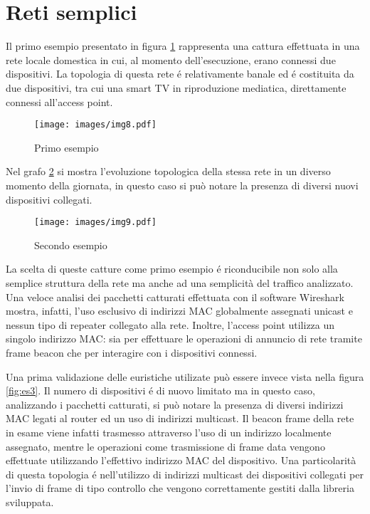 \section{Reti semplici}

Il primo esempio presentato in figura \ref{fig:es1} rappresenta una cattura effettuata in una rete locale domestica in cui, al momento dell'esecuzione, erano connessi due dispositivi.
La topologia di questa rete \'e relativamente banale ed \'e costituita da due dispositivi, tra cui una smart TV in riproduzione mediatica, direttamente connessi all'access point.

\begin{figure}[!h]
	\centering
	\texttt{[image: images/img8.pdf]}
	\caption{Primo esempio}
	\label{fig:es1}
\end{figure}


Nel grafo \ref{fig:es2} si mostra l'evoluzione topologica della stessa rete in un diverso momento della giornata, in questo caso si pu\`o notare la presenza di diversi nuovi dispositivi collegati.
\begin{figure}[!h]
	\centering
	\texttt{[image: images/img9.pdf]}
	\caption{Secondo esempio}
	\label{fig:es2}
\end{figure}

La scelta di queste catture come primo esempio \'e riconducibile non solo alla semplice struttura della rete ma anche ad una semplicit\`a del traffico analizzato.
Una veloce analisi dei pacchetti catturati effettuata con il software Wireshark mostra, infatti, l'uso esclusivo di indirizzi MAC globalmente assegnati unicast e nessun tipo di repeater collegato alla rete.
Inoltre, l'access point utilizza un singolo indirizzo MAC: sia per effettuare le operazioni di annuncio di rete tramite frame beacon che per interagire con i dispositivi connessi.

Una prima validazione delle euristiche utilizate pu\`o essere invece vista nella figura \ref{fig:es3}.
Il numero di dispositivi \'e di nuovo limitato ma in questo caso, analizzando i pacchetti catturati, si pu\`o notare la presenza di diversi indirizzi MAC legati al router ed un uso di indirizzi multicast.
Il beacon frame della rete in esame viene infatti trasmesso attraverso l'uso di un indirizzo localmente assegnato, mentre le operazioni come trasmissione di frame data vengono effettuate utilizzando l'effettivo indirizzo MAC del dispositivo.
Una particolarit\`a di questa topologia \'e nell'utilizzo di indirizzi multicast dei dispositivi collegati per l'invio di frame di tipo controllo che vengono correttamente gestiti dalla libreria sviluppata.

